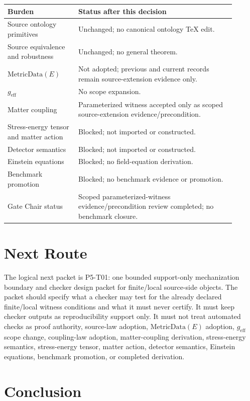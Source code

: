 \documentclass[11pt]{article}
\newcommand{\MetricData}{\mathrm{MetricData}}
\newcommand{\geff}{g_{\mathrm{eff}}}
\begin{document}
\begin{longtable}{@{}p{0.28\linewidth}p{0.62\linewidth}@{}}
\toprule
Burden & Status after this decision \\
\midrule
Source ontology primitives & Unchanged; no canonical ontology TeX edit. \\
Source equivalence and robustness & Unchanged; no general theorem. \\
\(\MetricData(E)\) & Not adopted; previous and current records remain source-extension evidence only. \\
\(\geff\) & No scope expansion. \\
Matter coupling & Parameterized witness accepted only as scoped source-extension evidence/precondition. \\
Stress-energy tensor and matter action & Blocked; not imported or constructed. \\
Detector semantics & Blocked; not imported or constructed. \\
Einstein equations & Blocked; no field-equation derivation. \\
Benchmark promotion & Blocked; no benchmark evidence or promotion. \\
Gate Chair status & Scoped parameterized-witness evidence/precondition review completed; no benchmark closure. \\
\bottomrule
\end{longtable}

\section{Next Route}

The logical next packet is P5-T01: one bounded support-only mechanization
boundary and checker design packet for finite/local source-side objects. The
packet should specify what a checker may test for the already declared
finite/local witness conditions and what it must never certify. It must keep
checker outputs as reproducibility support only. It must not treat automated
checks as proof authority, source-law adoption, \(\MetricData(E)\) adoption,
\(\geff\) scope change, coupling-law adoption, matter-coupling derivation,
stress-energy semantics, stress-energy tensor, matter action, detector
semantics, Einstein equations, benchmark promotion, or completed derivation.

\section{Conclusion}
\end{document}
